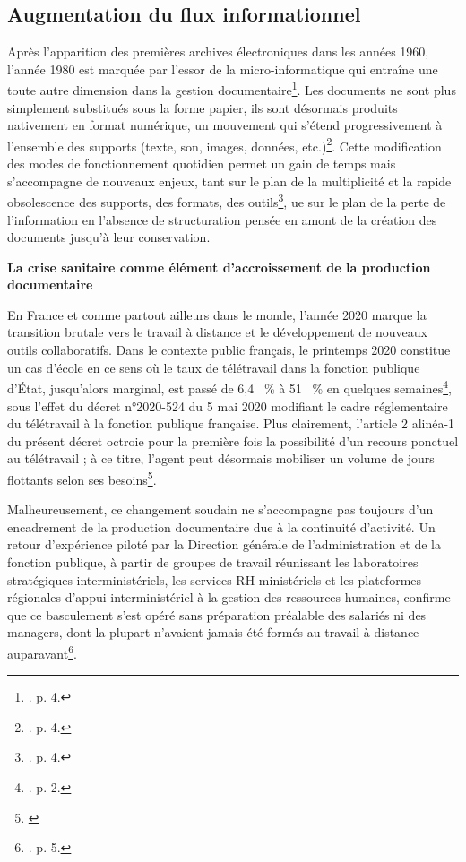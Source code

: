 \subsection*{Augmentation du flux informationnel}

Après l’apparition des premières archives électroniques dans les années 1960, l’année 1980 est marquée par l’essor de la micro-informatique qui entraîne une toute autre dimension dans la gestion documentaire\footnote{\cite{archives-en-musees-electroniques}. p. 4.}. Les documents ne sont plus simplement substitués sous la forme papier, ils sont désormais produits nativement en format numérique, un mouvement qui s’étend progressivement à l’ensemble des supports (texte, son, images, données, etc.)\footnote{\cite{archives-en-musees-electroniques}. p. 4.}. Cette modification des modes de fonctionnement quotidien permet un gain de temps mais s'accompagne de nouveaux enjeux, tant sur le plan de la multiplicité et la rapide obsolescence des supports, des formats, des outils\footnote{\cite{archives-en-musees-electroniques}. p. 4.}, ue sur le plan de la perte de l’information en l’absence de structuration pensée en amont de la création des documents jusqu’à leur conservation.

\textbf{La crise sanitaire comme élément d’accroissement de la production documentaire}

En France et comme partout ailleurs dans le monde, l’année 2020 marque la transition brutale vers le travail à distance et le développement de nouveaux outils collaboratifs. Dans le contexte public français, le printemps 2020 constitue un cas d’école en ce sens où le taux de télétravail dans la fonction publique d’État, jusqu’alors marginal, est passé de 6,4 ~\% à 51 ~\% en quelques semaines\footnote{\cite{dgafp-teletravail-2020}. p. 2.}, sous l’effet du décret n°2020-524 du 5 mai 2020 modifiant le cadre réglementaire du télétravail à la fonction publique française. Plus clairement, l’article 2 alinéa-1 du présent décret octroie pour la première fois la possibilité d’un recours ponctuel au télétravail ; à ce titre, l’agent peut désormais mobiliser un volume de jours flottants selon ses besoins\footnote{\cite{decret-2020-524}}.

Malheureusement, ce changement soudain ne s’accompagne pas toujours d’un encadrement de la production documentaire due à la continuité d’activité. Un retour d’expérience piloté par la Direction générale de l’administration et de la fonction publique, à partir de groupes de travail réunissant les laboratoires stratégiques interministériels, les services RH ministériels et les plateformes régionales d’appui interministériel à la gestion des ressources humaines, confirme que ce basculement s’est opéré sans préparation préalable des salariés ni des managers, dont la plupart n’avaient jamais été formés au travail à distance auparavant\footnote{\cite{dgafp-teletravail-2020}. p. 5.}.

